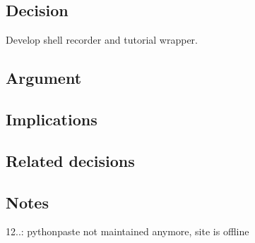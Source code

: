 \subsection*{Decision}

Develop shell recorder and tutorial wrapper.

\subsection*{Argument}

\subsection*{Implications}

\subsection*{Related decisions}

\subsection*{Notes}


\begin{DoxyItemize}
\item 12..\+: pythonpaste not maintained anymore, site is offline 
\end{DoxyItemize}